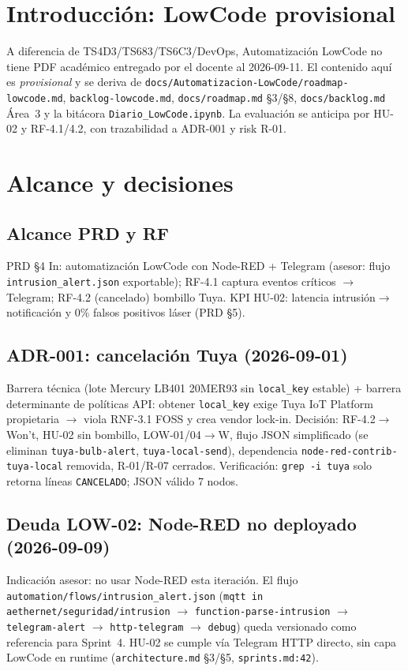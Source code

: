 \documentclass[conference]{IEEEtran}
\begin{document}
\section{Introducción: LowCode provisional}
A diferencia de TS4D3/TS683/TS6C3/DevOps, Automatización LowCode no tiene PDF académico entregado por el docente al 2026-09-11. El contenido aquí es \emph{provisional} y se deriva de \texttt{docs/Automatizacion-LowCode/roadmap-lowcode.md}, \texttt{backlog-lowcode.md}, \texttt{docs/roadmap.md} \S3/\S8, \texttt{docs/backlog.md} Área~3 y la bitácora \texttt{Diario\_LowCode.ipynb}. La evaluación se anticipa por HU-02 y RF-4.1/4.2, con trazabilidad a ADR-001 y risk R-01.

\section{Alcance y decisiones}
\subsection{Alcance PRD y RF}
PRD \S4 In: automatización LowCode con Node-RED + Telegram (asesor: flujo \texttt{intrusion\_alert.json} exportable); RF-4.1 captura eventos críticos $\rightarrow$ Telegram; RF-4.2 (cancelado) bombillo Tuya. KPI HU-02: latencia intrusión$\rightarrow$notificación y 0\% falsos positivos láser (PRD \S5).

\subsection{ADR-001: cancelación Tuya (2026-09-01)}
Barrera técnica (lote Mercury LB401 20MER93 sin \texttt{local\_key} estable) + barrera determinante de políticas API: obtener \texttt{local\_key} exige Tuya IoT Platform propietaria $\rightarrow$ viola RNF-3.1 FOSS y crea vendor lock-in. Decisión: RF-4.2$\rightarrow$Won't, HU-02 sin bombillo, LOW-01/04$\rightarrow$W, flujo JSON simplificado (se eliminan \texttt{tuya-bulb-alert}, \texttt{tuya-local-send}), dependencia \texttt{node-red-contrib-tuya-local} removida, R-01/R-07 cerrados. Verificación: \texttt{grep -i tuya} solo retorna líneas \texttt{CANCELADO}; JSON válido 7 nodos.

\subsection{Deuda LOW-02: Node-RED no deployado (2026-09-09)}
Indicación asesor: no usar Node-RED esta iteración. El flujo \texttt{automation/flows/intrusion\_alert.json} (\texttt{mqtt in aethernet/seguridad/intrusion} $\rightarrow$ \texttt{function-parse-intrusion} $\rightarrow$ \texttt{telegram-alert} $\rightarrow$ \texttt{http-telegram} $\rightarrow$ \texttt{debug}) queda versionado como referencia para Sprint~4. HU-02 se cumple vía Telegram HTTP directo, sin capa LowCode en runtime (\texttt{architecture.md} \S3/\S5, \texttt{sprints.md:42}).
\end{document}
